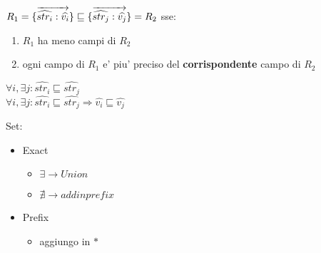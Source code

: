 $ R_1=\{\overrightarrow{\widehat{str_i}:\widehat{v_i}}\} \sqsubseteq \{\overrightarrow{\widehat{str_j}:\widehat{v_j}}\}=R_2 $ sse:
\begin{enumerate}
\item $R_1$ ha meno campi di $R_2$
\item ogni campo di $R_1$ e' piu' preciso del \textbf{corrispondente} campo di $R_2$ 
\end{enumerate}

$\forall i, \exists j: \widehat{str_i} \sqsubseteq \widehat{str_j}$\\
$\forall i, \exists j: \widehat{str_i} \sqsubseteq \widehat{str_j} \Rightarrow \widehat{v_i} \sqsubseteq \widehat{v_j}$

Set:
\begin{itemize}
\item Exact
	\begin{itemize}
	\item $\exists \rightarrow Union$
	\item $\nexists \rightarrow add in prefix$
	\end{itemize}
\item Prefix
	\begin{itemize}
	\item aggiungo in $*$
	\end{itemize}
\end{itemize}

